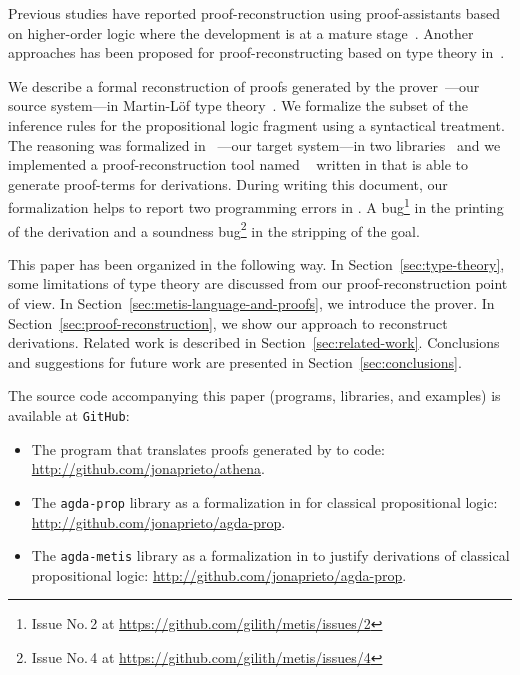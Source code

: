 \documentclass[../main.tex]{subfiles}
\begin{document}
Previous studies have reported proof-reconstruction using
proof-assistants based on higher-order logic where the development is at a mature
stage~\cite{paulson2010three,hurlin07practical,kaliszyk2013}.
Another approaches has been proposed for proof-reconstructing based
on type theory in~\cite{Bezem2002,kanso2016light,Keller2013}.

We describe a formal reconstruction of proofs generated by the \Metis
prover~\cite{hurd2003first}---our source system---in Martin-Löf type
theory~\cite{Nordstrom-Petersson-Smith-1990}. We
formalize the subset of the \Metis inference rules for the
propositional logic fragment using a syntactical treatment.
The \Metis reasoning was formalized in
\Agda~\cite{agdateam}---our target system---in two
libraries~\cite{AgdaProp,AgdaMetis} and we implemented a
proof-reconstruction tool named \Athena~\cite{Athena} written in
\Haskell that is able to generate \Agda proof-terms for \Metis
derivations. During writing this document, our formalization helps to report
two programming errors in \Metis.
A bug\footnote{Issue No.\,2 at \url{https://github.com/gilith/metis/issues/2}}
in the printing of the derivation and a soundness
bug\footnote{Issue No.\,4 at \url{https://github.com/gilith/metis/issues/4}} in the stripping of the goal.


This paper has been organized in the following way.  In
Section~\ref{sec:type-theory}, some limitations of type theory are
discussed from our proof-reconstruction point of view.  In
Section~\ref{sec:metis-language-and-proofs}, we introduce the \Metis
prover.  In Section~\ref{sec:proof-reconstruction}, we show our
approach to reconstruct \Metis derivations.  Related work is described in
Section~\ref{sec:related-work}.  Conclusions and suggestions for
future work are presented in Section~\ref{sec:conclusions}.

The source code accompanying this paper (programs, libraries, and
examples) is available at \verb!GitHub!:

\begin{itemize}
  \item The \Athena program that translates proofs generated by \Metis
  to \Agda code: \url{http://github.com/jonaprieto/athena}.

  \item The \verb!agda-prop! library as a formalization in \Agda for
    classical propositional logic:
  \url{http://github.com/jonaprieto/agda-prop}.

  \item The \verb!agda-metis! library as a formalization in \Agda to
  justify \Metis derivations of classical propositional logic:
  \url{http://github.com/jonaprieto/agda-prop}.

\end{itemize}
\end{document}
